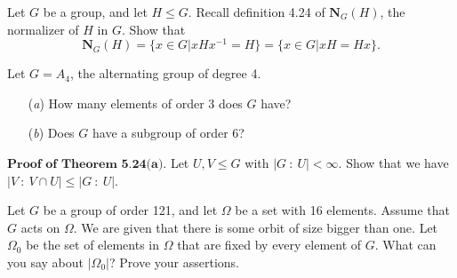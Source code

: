 \documentclass[12pt,letterpaper,boxed]{hmcpset}
\begin{document}

\begin{problem}[5.1.10]
Let $G$ be a group, and let $H \leq G$. Recall definition 4.24 of $\textbf{N}_G(H)$, the normalizer of $H$ in $G$. Show that
$$ \textbf{N}_G(H) = \{ x \in G \vert xHx^{-1} = H \} = \{ x \in G \vert xH = Hx \}. $$
\end{problem}

\begin{solution}

\end{solution}

\clearpage

\begin{problem}[5.1.19]
Let $G = A_4$, the alternating group of degree 4.
\begin{itemize}
  \item[(\textit{a})] How many elements of order 3 does $G$ have?
  
  \item[(\textit{b})] Does $G$ have a subgroup of order 6?
\end{itemize}
\end{problem}

\begin{solution}
\end{solution}

\clearpage

\begin{problem}[5.2.13]
$\textbf{Proof of Theorem 5.24(a).}$ Let $ U,V \leq G $ with $ |G \ : \ U| < \infty $. Show that we have $ |V \ : \ V \cap U| \leq |G \ : \ U| $.
\end{problem}

\begin{solution}
\end{solution}

\clearpage


\begin{problem}[6.1.3]
Let $G$ be a group of order 121, and let $\Omega$ be a set with 16 elements. Assume that $G$ acts on $\Omega$. We are given that there is some orbit of size bigger than one. Let $\Omega_0$ be the set of elements in $\Omega$ that are fixed by every element of $G$. What can you say about $\vert \Omega_0 \vert$? Prove your assertions. 
\end{problem}

\begin{solution}
\end{solution}
\end{document}
